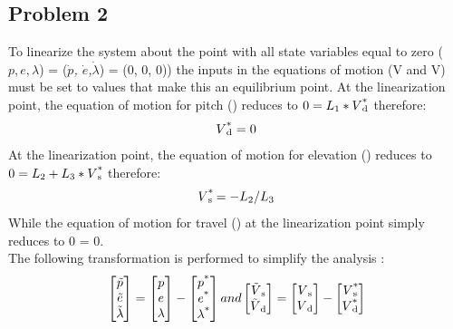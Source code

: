 \subsection{Problem 2}
	To linearize the system about the point with all state variables equal to zero ($p, e, \lambda$) = (\textit{$\dot{p}$, $\dot{e}$,$\dot{\lambda}$}) = (0, 0, 0))  the inputs in the equations of motion (V and V) must be set to values that make this an equilibrium point.
	At the linearization point, the equation of motion for pitch () reduces to $0 = L\SB{1} * V\SPSB{*}{d}$ therefore:
	\begin{equation}
		V\SPSB{*}{d} = 0
	\end{equation}
	At the linearization point, the equation of motion for elevation () reduces to $0 = L\SB{2} + L\SB{3}*V\SPSB{*}{s}$ therefore:
	\begin{equation}
	V\SPSB{*}{s} = -L\SB{2} / L\SB{3}
	\end{equation}
While the equation of motion for travel () at the linearization point simply reduces to 0 = 0.
	\\The following transformation is performed to simplify the analysis :
	\begin{equation}
		\begin{bmatrix}
			\tilde{p} \\
			\tilde{e} \\
			\tilde{\lambda}
		\end{bmatrix} 
		=
		\begin{bmatrix}
			p \\
			e \\
			\lambda
		\end{bmatrix} 
		- 
		\begin{bmatrix}
			p\SP{*} \\
			e\SP{*} \\
			\lambda\SP{*}
		\end{bmatrix}
		and
		\begin{bmatrix}
			\tilde{V}\SB{s} \\
			\tilde{V}\SB{d}
		\end{bmatrix}
		=
		\begin{bmatrix}
			V\SB{s} \\
			V\SB{d}
		\end{bmatrix} 
		- 
		\begin{bmatrix}
			V\SPSB{*}{s} \\
			V\SPSB{*}{d} 
		\end{bmatrix}
	\end{equation}
